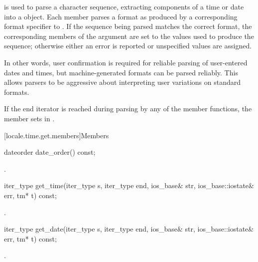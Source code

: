 \pnum
{} is used to parse a character sequence,
extracting components of a time or date into a  object.
Each  member parses a format as produced by a corresponding format specifier to
.
If the sequence being parsed matches the correct format, the corresponding
members of the
argument are set to the values used to produce the sequence; otherwise
either an error is reported or unspecified values are assigned.
\begin{footnote}
In
other words, user confirmation is required for reliable parsing of
user-entered dates and times, but machine-generated formats can be
parsed reliably.
This allows parsers to be aggressive about
interpreting user variations on standard formats.
\end{footnote}

\pnum
If the end iterator is reached during parsing by any of the
member functions, the member sets
in .

[locale.time.get.members]{Members}

%
\begin{itemdecl}
dateorder date_order() const;
\end{itemdecl}

\begin{itemdescr}
\pnum
\returns
{}.
\end{itemdescr}

%
\begin{itemdecl}
iter_type get_time(iter_type s, iter_type end, ios_base& str,
                   ios_base::iostate& err, tm* t) const;
\end{itemdecl}

\begin{itemdescr}
\pnum
\returns
{}.
\end{itemdescr}

%
\begin{itemdecl}
iter_type get_date(iter_type s, iter_type end, ios_base& str,
                   ios_base::iostate& err, tm* t) const;
\end{itemdecl}

\begin{itemdescr}
\pnum
\returns
{}.
\end{itemdescr}

